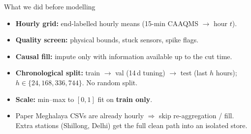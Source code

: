 \begin{frame}{What we did before modelling}
  \begin{itemize}
    \item \textbf{Hourly grid:} end-labelled hourly means (15-min CAAQMS $\to$ hour $t$).
    \item \textbf{Quality screen:} physical bounds, stuck sensors, spike flags.
    \item \textbf{Causal fill:} impute only with information available up to the cut time.
    \item \textbf{Chronological split:} train $\to$ val (14\,d tuning) $\to$ test (last $h$ hours);\\
          $h\in\{24,168,336,744\}$. No random split.
    \item \textbf{Scale:} min--max to $[0,1]$ fit on \textbf{train only}.
    \item Paper Meghalaya CSVs are already hourly $\Rightarrow$ skip re-aggregation / fill.\\
          Extra stations (Shillong, Delhi) get the full clean path into an isolated store.
  \end{itemize}
\end{frame}
